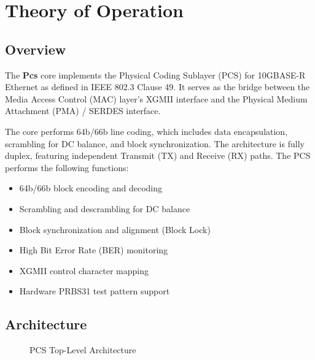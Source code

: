 \section{Theory of Operation}

\subsection{Overview}
The \textbf{Pcs} core implements the Physical Coding Sublayer (PCS) for 10GBASE-R Ethernet as defined in IEEE 802.3 Clause 49. It serves as the bridge between the Media Access Control (MAC) layer’s XGMII interface and the Physical Medium Attachment (PMA) / SERDES interface.

The core performs 64b/66b line coding, which includes data encapsulation, scrambling for DC balance, and block synchronization. The architecture is fully duplex, featuring independent Transmit (TX) and Receive (RX) paths.
The PCS performs the following functions:
\begin{itemize}
    \item 64b/66b block encoding and decoding
    \item Scrambling and descrambling for DC balance
    \item Block synchronization and alignment (Block Lock)
    \item High Bit Error Rate (BER) monitoring
    \item XGMII control character mapping
    \item Hardware PRBS31 test pattern support
\end{itemize}

\subsection{Architecture}
\begin{figure}[H]
\centering
{}
\caption{PCS Top-Level Architecture}\label{fig:pcs_arch}
\end{figure}



